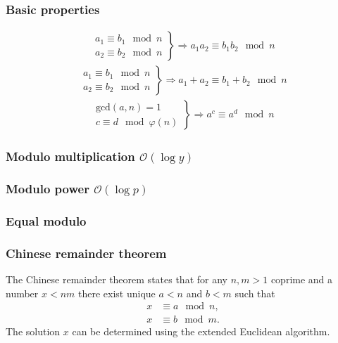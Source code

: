 \subsubsection{Basic properties}
\begin{align*}
    \left.\begin{array}{r}
        a_1 \equiv b_1 \mod n \\
        a_2 \equiv b_2 \mod n
    \end{array}\right\}
    \Rightarrow a_1a_2 \equiv b_1b_2 \mod n
\end{align*}
\begin{align*}
    \left.\begin{array}{r}
        a_1 \equiv b_1 \mod n \\
        a_2 \equiv b_2 \mod n
    \end{array}\right\}
    \Rightarrow a_1 + a_2 \equiv b_1 + b_2 \mod n
\end{align*}
\begin{align*}
    \left.\begin{array}{r}
        \text{gcd}(a, n) = 1 \\
        c \equiv d \mod \varphi(n)
    \end{array}\right\}
    \Rightarrow a^c \equiv a^d \mod n
\end{align*}

\subsubsection{Modulo multiplication $\mathcal O(\log y)$}

\subsubsection{Modulo power $\mathcal O(\log p)$}

\subsubsection{Equal modulo}

\subsubsection{Chinese remainder theorem}
The Chinese remainder theorem states that for any $n, m > 1$ coprime and a number $x < nm$ there exist unique $a < n$ and $b < m$ such that
\begin{align*}
    x &\equiv a \mod n, \\
    x &\equiv b \mod m.
\end{align*}
The solution $x$ can be determined using the extended Euclidean algorithm.

